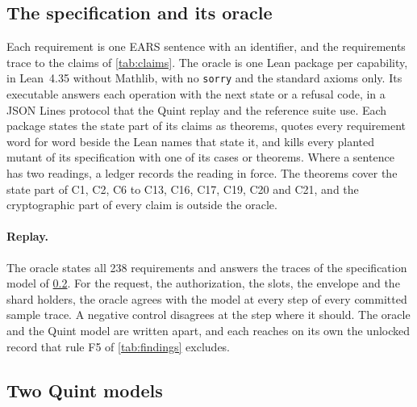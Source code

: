\subsection{The specification and its oracle}

Each requirement is one EARS sentence with an identifier, and the requirements trace to the claims of \cref{tab:claims}. The oracle is one Lean package per capability, in Lean~4.35 without Mathlib, with no \texttt{sorry} and the standard axioms only. Its executable answers each operation with the next state or a refusal code, in a JSON Lines protocol that the Quint replay and the reference suite use. Each package states the state part of its claims as theorems, quotes every requirement word for word beside the Lean names that state it, and kills every planted mutant of its specification with one of its cases or theorems. Where a sentence has two readings, a ledger records the reading in force. The theorems cover the state part of C1, C2, C6 to C13, C16, C17, C19, C20 and C21, and the cryptographic part of every claim is outside the oracle.

\paragraph{Replay.} The oracle states all 238 requirements and answers the traces of the specification model of \cref{sec:formal-quint}. For the request, the authorization, the slots, the envelope and the shard holders, the oracle agrees with the model at every step of every committed sample trace. A negative control disagrees at the step where it should. The oracle and the Quint model are written apart, and each reaches on its own the unlocked record that rule F5 of \cref{tab:findings} excludes.

\subsection{Two Quint models}\label{sec:formal-quint}

